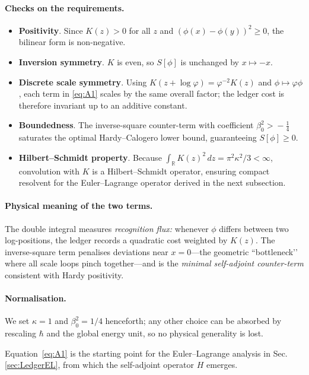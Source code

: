 \documentclass[11pt]{article}
\begin{document}
\paragraph{Checks on the requirements.}
\begin{itemize}
\item \textbf{Positivity}.
      Since $K(z)>0$ for all $z$ and
      $(\phi(x)-\phi(y))^{2}\ge0$, the bilinear form is non-negative.
\item \textbf{Inversion symmetry}.
      $K$ is even, so $S[\phi]$ is unchanged by $x\mapsto-x$.
\item \textbf{Discrete scale symmetry}.
      Using\;
      $K(z+\log\varphi)=\varphi^{-2}K(z)$ and
      $\phi\mapsto\varphi\phi$,
      each term in \eqref{eq:A1} scales by the same overall factor;
      the ledger cost is therefore invariant up to an additive
      constant.
\item \textbf{Boundedness}.
      The inverse-square counter-term with coefficient
      $\beta_{0}^{2}>\!-\tfrac14$ saturates the optimal Hardy–Calogero
      lower bound, guaranteeing $S[\phi]\ge0$.
\item \textbf{Hilbert–Schmidt property}.
      Because $\int_{\mathbb R}K(z)^{2}\,dz= \pi^{2}\kappa^{2}/3<\infty$,
      convolution with $K$ is a Hilbert–Schmidt operator, ensuring
      compact resolvent for the Euler–Lagrange operator derived in the
      next subsection.
\end{itemize}

\paragraph{Physical meaning of the two terms.}
The double integral measures \emph{recognition flux:}
whenever $\phi$ differs between two log-positions, the ledger records a
quadratic cost weighted by $K(z)$.  The inverse-square term
penalises deviations near $x=0$—the geometric ``bottleneck’’ where all
scale loops pinch together—and is the \emph{minimal self-adjoint
counter-term} consistent with Hardy positivity.

\paragraph{Normalisation.}
We set $\kappa=1$ and $\beta_{0}^{2}=1/4$ henceforth; any other choice
can be absorbed by rescaling $\hbar$ and the global energy unit, so no
physical generality is lost.

Equation~\eqref{eq:A1} is the starting point for the Euler–Lagrange
analysis in Sec.\,\ref{sec:LedgerEL}, from which the self-adjoint
operator $H$ emerges.
\end{document}
